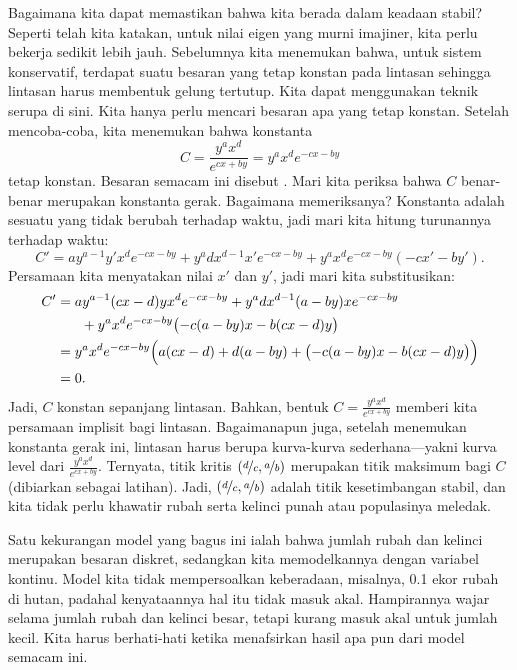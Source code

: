 Bagaimana kita dapat memastikan bahwa kita berada dalam keadaan stabil?
Seperti telah kita katakan, untuk nilai eigen yang murni imajiner, kita perlu
bekerja sedikit lebih jauh. Sebelumnya kita menemukan bahwa, untuk sistem
konservatif, terdapat suatu besaran yang tetap konstan pada lintasan
sehingga lintasan harus membentuk gelung tertutup.
Kita dapat menggunakan teknik serupa di sini. Kita hanya perlu mencari
besaran apa yang tetap konstan. Setelah mencoba-coba, kita menemukan bahwa
konstanta
\begin{equation*}
C = \frac{y^a x^d}{e^{cx+by}} = y^a x^d e^{-cx-by}
\end{equation*}
tetap konstan. Besaran semacam ini disebut \emph{}. Mari kita periksa bahwa $C$ benar-benar merupakan konstanta gerak.
Bagaimana memeriksanya? Konstanta adalah sesuatu yang tidak berubah terhadap
waktu, jadi mari kita hitung turunannya terhadap waktu:
\begin{equation*}
C' = 
a y^{a-1}y' x^d e^{-cx-by}
+
y^a d x^{d-1} x' e^{-cx-by}
+
y^a x^d e^{-cx-by} (-cx'-by') .
\end{equation*}
Persamaan kita menyatakan nilai $x'$ dan $y'$, jadi mari kita substitusikan:
\begin{equation*}
\begin{split}
C' & = 
a y^{a-1} (cx-d)y x^d e^{-cx-by}
+
y^a d x^{d-1} (a-by)x e^{-cx-by}
\\
& \phantom{mm} +
y^a x^d e^{-cx-by} \bigl(-c(a-by)x-b(cx-d)y\bigr)
\\
& =
y^a x^d e^{-cx-by}
\Bigl(
a (cx-d)
+
d (a-by)
+
\bigl(-c(a-by)x-b(cx-d)y\bigr) \Bigr)
\\
& = 
0 .
\end{split}
\end{equation*}
Jadi, $C$ konstan sepanjang lintasan. Bahkan, bentuk
$C = \frac{y^a x^d}{e^{cx+by}}$ memberi kita persamaan implisit bagi
lintasan. Bagaimanapun juga, setelah menemukan konstanta gerak ini,
lintasan harus berupa kurva-kurva sederhana---yakni kurva level dari
$\frac{y^a x^d}{e^{cx+by}}$. Ternyata, titik kritis
$(\nicefrac{d}{c},\nicefrac{a}{b})$ merupakan titik maksimum bagi $C$
(dibiarkan sebagai latihan). Jadi, $(\nicefrac{d}{c},\nicefrac{a}{b})$
adalah titik kesetimbangan stabil, dan kita tidak perlu khawatir rubah serta
kelinci punah atau populasinya meledak.

Satu kekurangan model yang bagus ini ialah bahwa jumlah rubah dan kelinci
merupakan besaran diskret, sedangkan kita memodelkannya dengan variabel
kontinu. Model kita tidak mempersoalkan keberadaan, misalnya, 0.1 ekor rubah
di hutan, padahal kenyataannya hal itu tidak masuk akal. Hampirannya wajar
selama jumlah rubah dan kelinci besar, tetapi kurang masuk akal untuk jumlah
kecil. Kita harus berhati-hati ketika menafsirkan hasil apa pun dari model
semacam ini.

